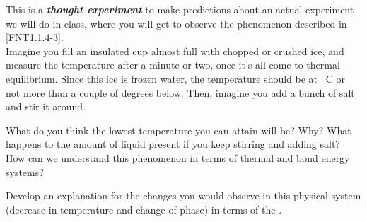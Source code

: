 \label{FNT1.1.4-4}


This \FNT{} is a \textbf{\emph{thought experiment}} to make predictions about an actual experiment we will do in class, where you will get to observe the phenomenon described in \ref{FNT1.1.4-3}.\\

Imagine you fill an insulated cup almost full with chopped or crushed ice, and measure the temperature after a minute or two, once it's all come to thermal equilibrium. Since this ice is frozen water, the temperature should be at \unit[0]{\textdegree C} or not more than a couple of degrees below. Then, imagine you add a bunch of salt and stir it around. 

What do you think the lowest temperature you can attain will be? Why? What happens to the amount of liquid present if you keep stirring and adding salt? How can we understand this phenomenon in terms of thermal and bond energy systems?

Develop an explanation for the changes you would observe in this physical system (decrease in temperature and change of phase) in terms of the \EnergyInteractionModel{}.